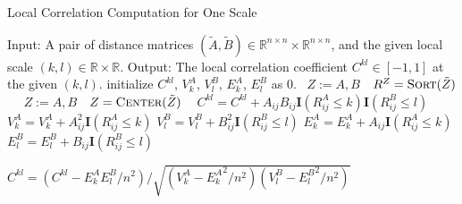 \documentclass[11pt]{article}
\providecommand{\mb}[1]{\boldsymbol{#1}}
\newcommand{\Real}{\mathbb{R}}
\newcommand{\G}{C}
\newcommand{\Linefor}[2]{%
    \State \algorithmicfor\ {#1}\ \algorithmicdo\ {#2} \algorithmicend\ \algorithmicfor%
}
\begin{document}
\begin{algorithm}
\caption{Local Correlation Computation for One Scale}
\label{alg:1scale}
\begin{algorithmic}[1]
\Statex Input: A pair of distance matrices $(\tilde{A},\tilde{B}) \in \Real^{n \times n} \times \Real^{n \times n}$, and the given local scale $(k,l) \in \Real \times \Real$.
\Statex Output: The local correlation coefficient $\G^{kl} \in [-1,1]$ at the given $(k,l)$.
\State initialize $\G^{kl}$, $V^{A}_{k}$, $V^{B}_{l}$, $E^{A}_{k}$, $E^{B}_{l}$ as $0$.
\Linefor{$Z:=A,B$}{$R^{Z}=\textsc{Sort}(\tilde{Z})$} 
\Linefor{$Z:=A,B$}{$Z=\textsc{Center}(\tilde{Z})$} 
\State $\G^{kl}=\G^{kl}+A_{ij}B_{ij}\mb{I}(R^{A}_{ij} \leq k)\mb{I}(R^{B}_{ij} \leq l)$ 
\State $V^{A}_{k}=V^{A}_{k}+A_{ij}^2\mb{I}(R^{A}_{ij} \leq k)$ 
\State $V^{B}_{l}=V^{B}_{l}+B_{ij}^2\mb{I}(R^{B}_{ij} \leq l)$ 
\State $E^{A}_{k}=E^{A}_{k}+A_{ij}\mb{I}(R^{A}_{ij} \leq k)$ 
\State $E^{B}_{l}=E^{B}_{l}+B_{ij}\mb{I}(R^{B}_{ij} \leq l)$
\EndFor

\State $\G^{kl}=\left(\G^{kl}-E^{A}_{k}E^{B}_{l}/n^2\right)/\sqrt{\left(V^{A}_{k}-{E^{A}_{k}}^2/n^2\right) \left(V^{B}_{l}-{E^{B}_{l}}^2/n^2\right)}$ 

\EndFunction
\end{algorithmic}
\end{algorithm}
\end{document}
